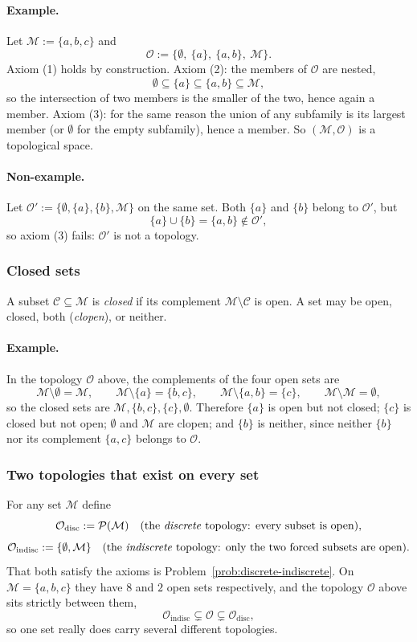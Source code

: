 \documentclass[11pt]{article}
\begin{document}
\paragraph{Example.} Let $\mathcal M:=\{a,b,c\}$ and
\[
\mathcal O:=\big\{\emptyset,\ \{a\},\ \{a,b\},\ \mathcal M\big\}.
\]
Axiom (1) holds by construction. Axiom (2): the members of $\mathcal O$ are nested,
\[
\emptyset\subseteq\{a\}\subseteq\{a,b\}\subseteq\mathcal M,
\]
so the intersection of two members is the smaller of the two, hence again a member. Axiom (3): for the same reason the union of any subfamily is its largest member (or $\emptyset$ for the empty subfamily), hence a member. So $(\mathcal M,\mathcal O)$ is a topological space.

\paragraph{Non-example.} Let $\mathcal O':=\{\emptyset,\{a\},\{b\},\mathcal M\}$ on the same set. Both $\{a\}$ and $\{b\}$ belong to $\mathcal O'$, but
\[
\{a\}\cup\{b\}=\{a,b\}\notin\mathcal O',
\]
so axiom (3) fails: $\mathcal O'$ is not a topology.

\subsubsection*{Closed sets}
A subset $\mathcal C\subseteq\mathcal M$ is \emph{closed} if its complement $\mathcal M\setminus\mathcal C$ is open. A set may be open, closed, both (\emph{clopen}), or neither.

\paragraph{Example.} In the topology $\mathcal O$ above, the complements of the four open sets are
\[
\mathcal M\setminus\emptyset=\mathcal M,\qquad
\mathcal M\setminus\{a\}=\{b,c\},\qquad
\mathcal M\setminus\{a,b\}=\{c\},\qquad
\mathcal M\setminus\mathcal M=\emptyset,
\]
so the closed sets are $\mathcal M,\{b,c\},\{c\},\emptyset$. Therefore $\{a\}$ is open but not closed; $\{c\}$ is closed but not open; $\emptyset$ and $\mathcal M$ are clopen; and $\{b\}$ is neither, since neither $\{b\}$ nor its complement $\{a,c\}$ belongs to $\mathcal O$.

\subsubsection*{Two topologies that exist on every set}
For any set $\mathcal M$ define
\[
\mathcal O_{\mathrm{disc}}:=\mathcal P(\mathcal M)\quad\text{(the \emph{discrete} topology: every subset is open)},
\]
\[
\mathcal O_{\mathrm{indisc}}:=\{\emptyset,\mathcal M\}\quad\text{(the \emph{indiscrete} topology: only the two forced subsets are open)}.
\]
That both satisfy the axioms is Problem~\ref{prob:discrete-indiscrete}. On $\mathcal M=\{a,b,c\}$ they have $8$ and $2$ open sets respectively, and the topology $\mathcal O$ above sits strictly between them,
\[
\mathcal O_{\mathrm{indisc}}\subsetneq\mathcal O\subsetneq\mathcal O_{\mathrm{disc}},
\]
so one set really does carry several different topologies.
\end{document}
